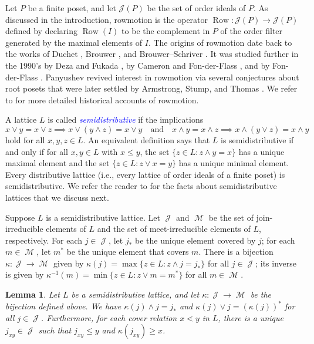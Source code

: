 \documentclass[11pt]{amsart}
\newtheorem{lemma}[theorem]{Lemma}
\theoremstyle{definition}
\DeclareMathOperator{\row}{Row}
\DeclareMathOperator{\JJ}{\mathscr{J}}
\DeclareMathOperator{\MM}{\mathscr{M}}
\newcommand{\dfn}[1]{\textcolor{blue}{\emph{#1}}}
\begin{document}
Let $P$ be a finite poset, and let $\mathcal J(P)$ be the set of order ideals of $P$. As discussed in the introduction, rowmotion is the operator $\row\colon\mathcal J(P)\to\mathcal J(P)$ defined by declaring $\row(I)$ to be the complement in $P$ of the order filter generated by the maximal elements of $I$. The origins of rowmotion date back to the works of Duchet \cite{Duchet}, Brouwer \cite{Brouwer}, and Brouwer--Schriver \cite{BrouwerSchriver}. It was studied further in the 1990's by Deza and Fukada \cite{DezaFukada}, by Cameron and Fon-der-Flass \cite{Cameron}, and by Fon-der-Flass \cite{FonderFlass}. Panyushev \cite{Panyushev} revived interest in rowmotion via several conjectures about root posets that were later settled by Armstrong, Stump, and Thomas \cite{AST}. We refer to \cite{StrikerWilliams,ThomasWilliams} for more detailed historical accounts of rowmotion. 

A lattice $L$ is called \dfn{semidistributive} if the implications \[x\vee y=x\vee z\implies x\vee(y\wedge z)=x\vee y\quad\text{and}\quad x\wedge y=x\wedge z\implies x\wedge(y\vee z)=x\wedge y\] hold for all $x,y,z\in L$. An equivalent definition says that $L$ is semidistributive if and only if for all $x,y\in L$ with $x\leq y$, the set $\{z\in L:z\wedge y=x\}$ has a unique maximal element and the set $\{z\in L:z\vee x=y\}$ has a unique minimal element. Every distributive lattice (i.e., every lattice of order ideals of a finite poset) is semidistributive. We refer the reader to \cite{Barnard, ThomasWilliams, Semidistrim} for the facts about semidistributive lattices that we discuss next. 

Suppose $L$ is a semidistributive lattice. Let $\JJ$ and $\MM$ be the set of join-irreducible elements of $L$ and the set of meet-irreducible elements of $L$, respectively. For each $j\in\JJ$, let $j_*$ be the unique element covered by $j$; for each $m\in\MM$, let $m^*$ be the unique element that covers $m$. There is a bijection $\kappa\colon\JJ\to\MM$ given by $\kappa(j)=\max\{z\in L:z\wedge j=j_*\}$ for all $j\in\JJ$; its inverse is given by $\kappa^{-1}(m)=\min\{z\in L:z\vee m=m^*\}$ for all $m\in\MM$. 

\begin{lemma}\label{lem:propertiesofkappa}
Let $L$ be a semidistributive lattice, and let $\kappa\colon\JJ\to\MM$ be the bijection defined above. We have $\kappa(j)\wedge j=j_*$ and $\kappa(j)\vee j=(\kappa(j))^*$ for all $j\in \JJ$. Furthermore, for each cover relation $x\lessdot y$ in $L$, there is a unique $j_{xy}\in\JJ$ such that $j_{xy}\leq y$ and $\kappa(j_{xy})\geq x$. 
\end{lemma}
\end{document}
